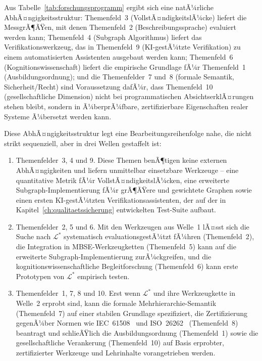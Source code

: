 ﻿\documentclass[a4paper,12pt]{report}
\theoremstyle{definition}
\begin{document}
\noindent
Aus Tabelle~\ref{tab:forschungsprogramm} ergibt sich eine natÃ¼rliche
AbhÃ¤ngigkeitsstruktur: Themenfeld~3 (VollstÃ¤ndigkeitslÃ¼cke) liefert die
MessgrÃ¶ÃŸen, mit denen Themenfeld~2 (Beschreibungssprache) evaluiert werden
kann; Themenfeld~4 (Subgraph Algorithmus) liefert das Verifikationswerkzeug,
das in Themenfeld~9 (KI-gestÃ¼tzte Verifikation) zu einem automatisierten
Assistenten ausgebaut werden kann; Themenfeld~6 (Kognitionswissenschaft)
liefert die empirische Grundlage fÃ¼r Themenfeld~1
(Ausbildungsordnung); und die Themenfelder~7 und~8 (formale Semantik,
Sicherheit/Recht) sind Voraussetzung dafÃ¼r, dass Themenfeld~10
(gesellschaftliche Dimension) nicht bei programmatischen AbsichtserklÃ¤rungen
stehen bleibt, sondern in Ã¼berprÃ¼fbare, zertifizierbare Eigenschaften realer
Systeme Ã¼bersetzt werden kann.

Diese AbhÃ¤ngigkeitsstruktur legt eine Bearbeitungsreihenfolge nahe, die
nicht strikt sequenziell, aber in drei Wellen gestaffelt ist:

\begin{enumerate}
  \item[\textbf{Welle 1 (Jahre 1--2):}] Themenfelder~3, 4 und 9. Diese
  Themen benÃ¶tigen keine externen AbhÃ¤ngigkeiten und liefern unmittelbar
  einsetzbare Werkzeuge -- eine quantitative Metrik fÃ¼r
  VollstÃ¤ndigkeitslÃ¼cken, eine erweiterte Subgraph-Implementierung fÃ¼r
  grÃ¶ÃŸere und gewichtete Graphen sowie einen ersten KI-gestÃ¼tzten
  Verifikationsassistenten, der auf der in Kapitel~\ref{ch:qualitaetssicherung}
  entwickelten Test-Suite aufbaut.

  \item[\textbf{Welle 2 (Jahre 2--5):}] Themenfelder~2, 5 und 6. Mit den
  Werkzeugen aus Welle~1 lÃ¤sst sich die Suche nach $\mathcal{L}^*$
  systematisch evaluationsgestÃ¼tzt fÃ¼hren (Themenfeld~2), die Integration
  in MBSE-Werkzeugketten (Themenfeld~5) kann auf die erweiterte
  Subgraph-Implementierung zurÃ¼ckgreifen, und die
  kognitionswissenschaftliche Begleitforschung (Themenfeld~6) kann erste
  Prototypen von $\mathcal{L}^*$ empirisch testen.

  \item[\textbf{Welle 3 (Jahre 5+):}] Themenfelder~1, 7, 8 und 10. Erst
  wenn $\mathcal{L}^*$ und ihre Werkzeugkette in Welle~2 erprobt sind, kann
  die formale Mehrhierarchie-Semantik (Themenfeld~7) auf einer stabilen
  Grundlage spezifiziert, die Zertifizierung gegenÃ¼ber Normen wie
  IEC~61508~\cite{iec61508} und ISO~26262~\cite{iso26262} (Themenfeld~8)
  beantragt und schlieÃŸlich die Ausbildungsordnung (Themenfeld~1) sowie die
  gesellschaftliche Verankerung (Themenfeld~10) auf Basis erprobter,
  zertifizierter Werkzeuge und Lehrinhalte vorangetrieben werden.
\end{enumerate}
\end{document}
